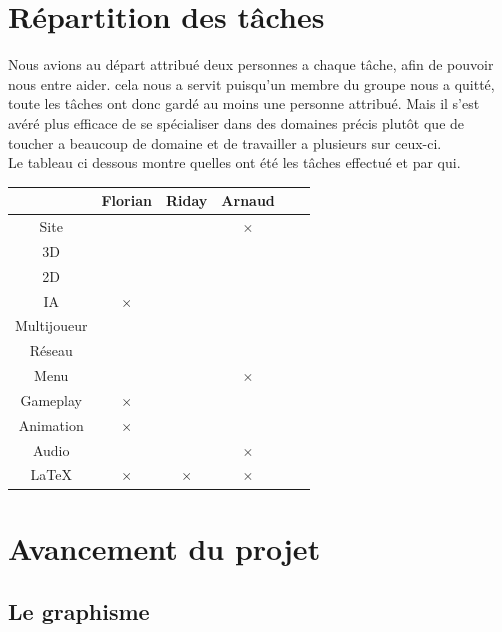 \documentclass[a4paper, 12pt]{article}
\begin{document}
\section{Répartition des tâches}
Nous avions au départ attribué deux personnes a chaque tâche, afin de pouvoir nous entre aider. cela nous a servit puisqu'un membre du groupe nous a quitté, toute les tâches ont donc gardé au moins une personne attribué. Mais il s'est avéré plus efficace de se spécialiser dans des domaines précis plutôt que de toucher a beaucoup de domaine et de travailler a plusieurs sur ceux-ci.\\
Le tableau ci dessous montre quelles ont été les tâches effectué et par qui.
\bigbreak
\bigbreak
	\begin{tabular}{|c||c|c|c|c|c|}
		\hline
		& Florian & Riday & Arnaud \\
		\hline
		Site & & & $\times$\\
		\hline
		3D & & &\\
		\hline
		2D & & & \\
		\hline
		IA & $\times$ & & \\
		\hline
		Multijoueur &  & &\\
		\hline
		Réseau & & & \\
		\hline
		Menu & & & $\times$\\
		\hline
		Gameplay & $\times$ & &\\
		\hline
		Animation & $\times$ & & \\		
		\hline
		Audio & & & $\times$\\
		\hline
		\LaTeX & $\times$ & $\times$ & $\times$\\
		\hline
	\end{tabular}
	\newpage
\newpage
\section{Avancement du projet}
	\subsection{Le graphisme}
\end{document}
